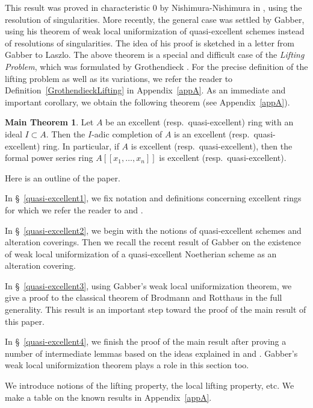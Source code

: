 \documentclass[11pt,a4paper]{amsart}
\theoremstyle{definition}
\newtheorem{maintheorema}{Main Theorem}
\theoremstyle{remark}
\begin{document}
This result was proved in characteristic 0 by Nishimura-Nishimura in \cite{Nishimura87}, using the resolution of singularities. More recently, the general case was settled by Gabber, using his theorem of weak local uniformization of quasi-excellent schemes instead of resolutions of singularities. 
The idea of his proof is sketched in a letter \cite{Laszlo07} from Gabber to Laszlo. The above theorem is a special and difficult case of the \textit{Lifting Problem}, which was formulated by Grothendieck \cite[Remarque (7.4.8)]{Gro}. For the precise definition of the lifting problem as well as its variations, we refer the reader to Definition~\ref{GrothendieckLifting} in Appendix~\ref{appA}. 
As an immediate and important corollary, we obtain the following theorem (see Appendix~\ref{appA}).


\begin{maintheorema}
\label{MT2}
Let $A$ be an excellent (resp.\ quasi-excellent) ring with an ideal $I \subset A$. Then the $I$-adic completion of $A$ is an excellent (resp.\ quasi-excellent) ring. In particular, if $A$ is excellent (resp.\ quasi-excellent), then the formal power series ring $A[[x_1,\ldots,x_n]]$ is excellent (resp.\ quasi-excellent).
\end{maintheorema}


Here is an outline of the paper.


In \S~\ref{quasi-excellent1}, we fix notation and definitions concerning excellent rings for which we refer the reader to \cite{Ma80} and \cite{Nishimura87}. 

In \S~\ref{quasi-excellent2}, we begin with the notions of quasi-excellent schemes and alteration coverings. Then we recall the recent result of Gabber on the existence of weak local uniformization of a quasi-excellent Noetherian scheme as an alteration covering.

In \S~\ref{quasi-excellent3}, using Gabber's weak local uniformization theorem, we give a proof to the classical theorem of Brodmann and Rotthaus in the full generality. This result is an important step toward the proof of the main result of this paper.

In \S~\ref{quasi-excellent4}, we finish the proof of the main result after proving a number of intermediate lemmas based on the ideas explained in \cite{Nishimura87} and \cite{Laszlo07}. Gabber's weak local uniformization theorem plays a role in this section too.

We introduce notions of the lifting property, the local lifting property, etc.
We make a table on the known results in Appendix~\ref{appA}.
\end{document}

